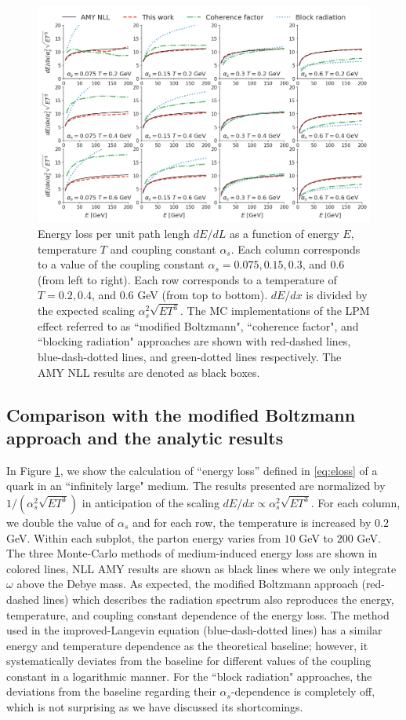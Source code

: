 \documentclass[aps, prc, reprint, amsmath, groupedaddress, nofootinbib]{revtex4-1}
\begin{document}
\begin{figure}
\centering
\includegraphics[width=1.\textwidth]{Eloss_infinite.pdf}
\caption{Energy loss per unit path lengh $dE/dL$ as a function of energy $E$, temperature $T$ and coupling constant $\alpha_s$. Each column corresponds to a value of the coupling constant $\alpha_s = 0.075, 0.15, 0.3$, and $0.6$ (from left to right). Each row corresponds to a temperature of $T = 0.2, 0.4$, and $0.6$ GeV (from top to bottom). $dE/dx$ is divided by the expected scaling $\alpha_s^2 \sqrt{ET^3}$. The MC implementations of the LPM effect referred to as ``modified Boltzmann", ``coherence factor", and ``blocking radiation" approaches are shown with red-dashed lines, blue-dash-dotted lines, and green-dotted lines respectively. The AMY NLL results are denoted as black boxes.}
\label{fig:eloss-inf}
\end{figure}


\subsection{Comparison with the modified Boltzmann approach and the analytic results}
In Figure \ref{fig:eloss-inf}, we show the calculation of ``energy loss'' defined in \ref{eq:eloss} of a quark in an ``infinitely large" medium. 
The results presented are normalized by $1/(\alpha_s^2 \sqrt{ET^3})$ in anticipation of the scaling $dE/dx \propto \alpha_s^2 \sqrt{ET^3}$.
For each column, we double the value of $\alpha_s$ and for each row, the temperature is increased by $0.2$ GeV. 
Within each subplot, the parton energy varies from $10$ GeV to $200$ GeV.
The three Monte-Carlo methods of medium-induced energy loss are shown in colored lines, 
NLL AMY results are shown as black lines where we only integrate $\omega$ above the Debye mass.
As expected, the modified Boltzmann approach (red-dashed lines) which describes the radiation spectrum also reproduces the energy, temperature, and coupling constant dependence of the energy loss.
The method used in the improved-Langevin equation (blue-dash-dotted lines) has a similar energy and temperature dependence as the theoretical baseline; however, it systematically deviates from the baseline for different values of the coupling constant in a logarithmic manner.
For the ``block radiation" approaches, the deviations from the baseline regarding their $\alpha_s$-dependence is completely off, which is not surprising as we have discussed its shortcomings.
\end{document}
